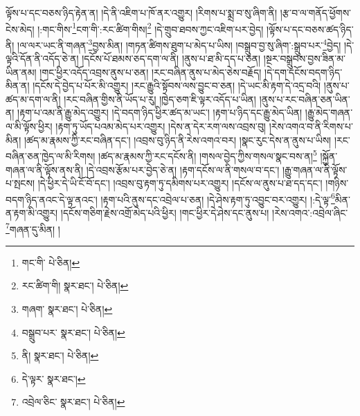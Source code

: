 ལྟོས་པ་དང་བཅས་ཉིད་རྟེན་ན། །དེ་ནི་འཇིག་པ་ཁོ་ནར་འགྱུར། །རིགས་པ་སྨྲ་བ་སུ་ཞིག་ནི། །རྩ་བ་ལ་གནོད་ཕྱོགས་ངེས་མེད། །:གང་གིས་\footnote{གང་གི་  པེ་ཅིན། }ངག་གི་:རང་ཚིག་གིས།\footnote{རང་ཚིག་གི།  སྣར་ཐང་།  པེ་ཅིན། } །དེ་གྲུབ་ཐབས་ཀྱང་འཇིག་པར་བྱེད། །ལྟོས་པ་དང་བཅས་ཚད་ཉིད་ནི། །ལ་ལར་ཡང་ནི་གཞན་\footnote{གཞག་  སྣར་ཐང་།  པེ་ཅིན། }བྱས་མིན། །གཏན་ཚིགས་ཐུག་པ་མེད་པ་ཡིས། །བསྒྲུབ་བྱ་སུ་ཞིག་:སྒྲུབ་པར་\footnote{བསྒྲུབ་པར་  སྣར་ཐང་།  པེ་ཅིན། }བྱེད། །དེ་ལྟའི་དོན་ནི་འདོད་ཅེ་ན། །དངོས་པོ་ཐམས་ཅད་དག་ལ་ནི། །ནུས་པ་ཐ་མི་དད་པ་ཅན། །སྔར་བསྒྲུབས་བྱས་ཟིན་མ་ཡིན་ནམ། །གང་ཕྱིར་འདོད་འབྲས་ནུས་པ་ཅན། །རང་བཞིན་ནུས་པ་མེད་ཅེས་བརྗོད། །དེ་དག་དངོས་བདག་ཉིད་མིན་ན། །དངོས་དེ་བྱེད་པ་པོར་མི་འགྱུར། །རང་རྒྱུའི་སྟོབས་ལས་བྱུང་བ་ཅན། །དེ་ཡང་མི་རྟག་དེ་འདྲ་བའི། །ནུས་པ་ཚད་མ་དག་ལ་ནི། །རང་བཞིན་གྱིས་ནི་ཡོད་པ་རུ། །ཁྱེད་ཅག་ཇི་ལྟར་འདོད་པ་ཡིན། །ནུས་པ་རང་བཞིན་ཅན་ཡིན་ན། །རྟག་པ་འམ་ནི་རྒྱུ་མེད་འགྱུར། །དེ་བདག་ཉིད་ཕྱིར་ཚད་མ་ཡང་། །རྟག་པ་ཉིད་དང་རྒྱུ་མེད་ཡིན། །རྒྱུ་མེད་གཞན་ལ་མི་ལྟོས་ཕྱིར། །རྟག་ཏུ་ཡོད་པའམ་མེད་པར་འགྱུར། །དེས་ན་དེར་རག་ལས་འབྲས་བུ། །རེས་འགའ་བ་ནི་རིགས་པ་མིན། །ཚད་མ་རྣམས་ཀྱི་རང་བཞིན་དང་། །འབྲས་བུ་ཉིད་ནི་རེས་འགའ་བར། །སྣང་རུང་དེས་ན་ནུས་པ་ཡིས། །རང་བཞིན་ཅན་ཁྱེད་ལ་མི་རིགས། །ཚད་མ་རྣམས་ཀྱི་རང་དངོས་ནི། །གསལ་བྱེད་ཀྱིས་གསལ་སྣང་བས་ན།\footnote{ནི།  སྣར་ཐང་།  པེ་ཅིན། } །སྐྱོན་གཞན་ལ་ནི་ལྟོས་ནས་ནི། །དེ་འབྲས་རྩོམ་པར་བྱེད་ཅེ་ན། །རྟག་དངོས་ལ་ནི་གསལ་བ་དང་། །རྒྱུ་གཞན་ལ་ནི་ལྟོས་པ་སྤངས། །དེ་ཕྱིར་དེ་ཡི་ངོ་བོ་དང་། །འབྲས་བུ་རྟག་ཏུ་དམིགས་པར་འགྱུར། །དངོས་ལ་ནུས་པ་ཐ་དད་དང་། །གཉིས་བདག་ཉིད་ནའང་དེ་ལྟ་ནའང་། །རྟག་པའི་ནུས་དང་འབྲེལ་པ་ཅན། །དེ་ཤེས་རྟག་ཏུ་འབྱུང་བར་འགྱུར། །:དེ་ལྟ་\footnote{དེ་ལྟར་  སྣར་ཐང་། }མིན་ན་རྟག་མི་འགྱུར། །དངོས་གཅིག་རྗེས་འགྲོ་མེད་པའི་ཕྱིར། །གང་ཕྱིར་དེ་ཤེས་དང་ནུས་པ། །རེས་འགའ་:འབྲེལ་ཞིང་\footnote{འབྲེལ་ཅིང་  སྣར་ཐང་།  པེ་ཅིན། }གཞན་དུ་མིན། །
